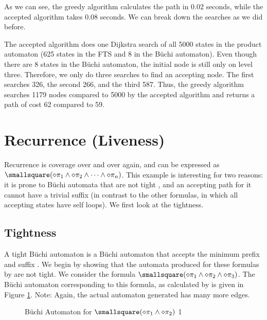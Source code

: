 As we can see, the greedy algorithm calculates the path in 0.02 seconds, while the accepted algorithm takes 0.08 seconds. We can break down the searches as we did before. 

The accepted algorithm does one Dijkstra search of all 5000 states in the product automaton (625 states in the FTS and 8 in the B\"uchi automaton). Even though there are 8 states in the B\"uchi automaton, the initial node is still only on level three. Therefore, we only do three searches to find an accepting node. The first searches 326, the second 266, and the third 587. Thus, the greedy algorithm searches 1179 nodes compared to 5000 by the accepted algorithm and returns a path of cost 62 compared to 59.

\section{Recurrence (Liveness)}
Recurrence is coverage over and over again, and can be expressed as $\smallsquare(\diamond \pi_1 \land \diamond \pi_2 \land \dots \land \diamond \pi_n)$. This example is interesting for two reasons: it is prone to B\"{u}chi automata that are not tight \cite{schuppan05}, and an accepting path for it cannot have a trivial suffix (in contrast to the other formulas, in which all accepting states have self loops). We first look at the tightness.

\subsection{Tightness}
A tight B\"uchi automaton is a B\"uchi automaton that accepts the minimum prefix and suffix \cite{schuppan05}. We begin by showing that the automata produced for these formulas by \cite{ltlbuchiwebsite} are not tight. We consider the formula $\smallsquare(\diamond \pi_1 \land \diamond \pi_2 \land \diamond \pi_3)$. The B\"{u}chi automaton corresponding to this formula, as calculated by \cite{gastin01} is given in Figure \ref{fig:gasBuchiRec}. Note: Again, the actual automaton generated has many more edges.

\begin{figure}
\centering
{}
\caption{B\"uchi Automaton for $\smallsquare(\diamond \pi_1 \land \diamond \pi_2 )$ 1}
\label{fig:gasBuchiRec}
\end{figure}


